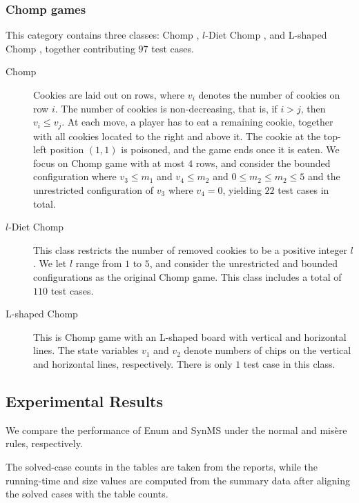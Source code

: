 \documentclass[review]{elsarticle}
\begin{document}
\subsubsection{Chomp games}
This category contains three classes: Chomp \cite{Sch1952}, $l$-Diet Chomp \cite{AhnCCEFGGKMPS2017}, and L-shaped Chomp \cite{Sch1952}, together contributing $97$ test cases.

\begin{description}
	\item[Chomp] Cookies are laid out on rows, where $v_i$ denotes the number of cookies on row $i$.
	The number of cookies is non-decreasing, that is, if $i > j$, then $v_i \leq v_j$.
	At each move, a player has to eat a remaining cookie, together with all cookies located to the right and above it. 
	The cookie at the top-left position $(1, 1)$ is poisoned, and the game ends once it is eaten. 
	We focus on Chomp game with at most $4$ rows, and consider the bounded configuration where $v_3 \leq m_1$ and $v_4 \leq m_2$ and $0 \leq m_2 \leq m_2 \leq 5$ and the unrestricted configuration of $v_3$ where $v_4 = 0$, yielding $22$ test cases in total.
	
	\item[$l$-Diet Chomp] This class restricts the number of removed cookies to be a positive integer $l$.
	We let $l$ range from $1$ to $5$, and consider the unrestricted and bounded configurations as the original Chomp game.
	This class includes a total of $110$ test cases.
	
	\item[L-shaped Chomp] This is Chomp game with an L-shaped board with vertical and horizontal lines. 
	The state variables $ v_1$ and $v_2$ denote numbers of chips on the vertical and horizontal lines, respectively.
	There is only $1$ test case in this class.
\end{description}



\subsection{Experimental Results}


We compare the performance of Enum and SynMS under the normal and mis\`{e}re rules, respectively.

The solved-case counts in the tables are taken from the reports, while the running-time and size values are computed from the summary data after aligning the solved cases with the table counts.
\end{document}
